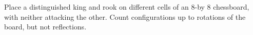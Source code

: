 Place a distinguished king and rook on different cells of an 8-by 8 chessboard, with neither attacking the other. Count configurations up to rotations of the board, but not reflections.
